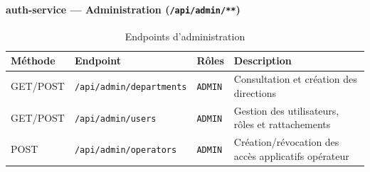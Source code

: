 \documentclass[11pt,a4paper]{article}
\begin{document}
\paragraph{auth-service — Administration (\texttt{/api/admin/**})}
\begin{table}[H]
\centering
\small
\begin{tabular}{|p{1.4cm}|p{3.4cm}|p{2.4cm}|p{6cm}|}
\hline
\textbf{Méthode} & \textbf{Endpoint} & \textbf{Rôles} & \textbf{Description} \\
\hline
GET/POST & \texttt{/api/admin/departments} & \texttt{ADMIN} & Consultation et création des directions \\
\hline
GET/POST & \texttt{/api/admin/users} & \texttt{ADMIN} & Gestion des utilisateurs, rôles et rattachements \\
\hline
POST & \texttt{/api/admin/operators} & \texttt{ADMIN} & Création/révocation des accès applicatifs opérateur \\
\hline
\end{tabular}
\caption{Endpoints d'administration}
\end{table}
\end{document}

